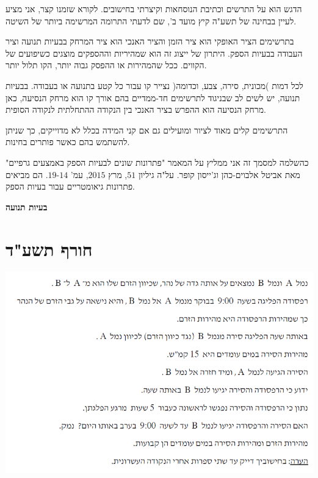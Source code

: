 \documentclass[12pt,a4paper]{article}
\begin{document}
\smallskip

הדגש הוא על התרשים וכתיבת הנוסחאות וקיצרתי בחישובים. לקורא שזמנו קצר, אני מציע לעיין בבחינה של תשע"ה קיץ מועד ב', שם לדעתי התרומה המרשימה ביותר של השיטה.

\smallskip

בתרשימים הציר האופקי הוא ציר הזמן והציר האנכי הוא ציר המרחק בבעיות תנועה וציר העבודה בבעיות הספק. היתרון של ייצוג זה הוא שמהיריות וההספקים מוצגים כשיפועים של הקווים. ככל שהמהירות או ההפסק גבוה יותר, הקו תלול יותר.

\smallskip

לכל דמות )מכונית, סירה, צבע, וכדומה( נצייר קו עבור כל קטע בתנועה או בעבודה. בבעיות תנועה, יש לשים לב שבניגוד לתרשימים חד-ממדיים בהם אורך קו הוא מרחק הנסיעה, כאן מרחק הנסיעה הוא ההפרש בציר האנכי בין הנקודה ההתחלתית לנקודה הסופית.

\smallskip

התרשימים קלים מאוד לציור ומועילים גם אם קני המידה בכלל לא מדוייקים, כך שניתן להשתמש בהם כאשר פותרים בחינות.

\bigskip


כהשלמה למסמך זה אני ממליץ על המאמר "פתרונות שונים לבעיות הספק באמצעים גרפיים" מאת אביטל אלבוים-כהן וג'ייסון קופר. על"ה גיליון
$51$,
מרץ
$2015$,
עמ'
$14$-$19$.
הם מביאים פתרונות גיאומטריים עבור בעיות הספק.

\newpage


\begin{center}
\textbf{\huge
בעיות תנועה}
\end{center}


\section*{חורף תשע"ד}

\begin{center}
\includegraphics[width=.8\textwidth]{winter-2014-1}
\end{center}
\end{document}
